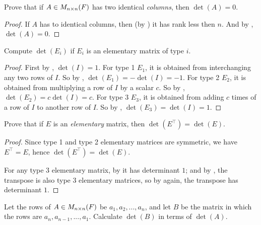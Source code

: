 \begin{exercise} \label{exercise 4.2.27}
Prove that if \(A \in M_{n \times n}(F)\) has two identical \emph{columns}, then \(\det(A) = 0\).
\end{exercise}

\begin{proof}
If \(A\) has to identical columns, then (by ) it has rank less then \(n\).
And by , \(\det(A) = 0\).
\end{proof}

\begin{exercise} \label{exercise 4.2.28}
Compute \(\det(E_i)\) if \(E_i\) is an elementary matrix of type \(i\).
\end{exercise}

\begin{proof}
First by , \(\det(I) = 1\).
For type 1 \(E_1\), it is obtained from interchanging any two rows of \(I\).
So by , \(\det(E_1) = -\det(I) = -1\).
For type 2 \(E_2\), it is obtained from multiplying a row of \(I\) by a scalar \(c\).
So by , \(\det(E_2) = c\det(I) = c\).
For type 3 \(E_3\), it is obtained from adding \(c\) times of a row of \(I\) to another row of \(I\).
So by , \(\det(E_3) = \det(I) = 1\).
\end{proof}

\begin{exercise} \label{exercise 4.2.29}
Prove that if \(E\) is an \emph{elementary} matrix, then \(\det(E^\top) = \det(E)\).
\end{exercise}

\begin{proof}
Since type 1 and type 2 elementary matrices are symmetric, we have \(E^\top = E\), hence \(\det(E^\top) = \det(E)\).

For any type 3 elementary matrix, by  it has determinant \(1\);
and by , the transpose is also type 3 elementary matrices, so by  again, the transpose has determinant \(1\).
\end{proof}

\begin{exercise} \label{exercise 4.2.30}
Let the rows of \(A \in M_{n \times n}(F)\) be \(a_1, a_2, ..., a_n\), and let \(B\) be the matrix in which the rows are \(a_n, a_{n - 1}, ..., a_1\).
Calculate \(\det(B)\) in terms of \(\det(A)\).
\end{exercise}

